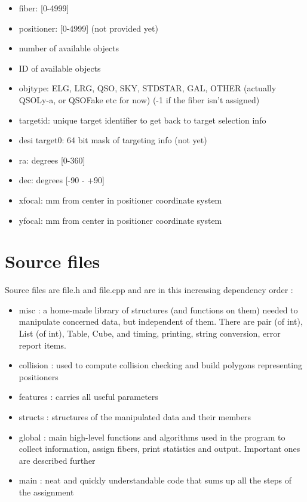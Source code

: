 \documentclass{article}
\begin{document}
\begin{itemize}
    \item fiber: [0-4999]
    \item positioner: [0-4999] (not provided yet)
    \item number of available objects
    \item ID of available objects
    \item objtype: ELG, LRG, QSO, SKY, STDSTAR, GAL, OTHER (actually QSOLy-a, or QSOFake etc for now) (-1 if the fiber isn't assigned)
    \item targetid: unique target identifier to get back to target selection info
    \item desi target0: 64 bit mask of targeting info (not yet)
    \item ra: degrees [0-360]
    \item dec: degrees [-90 - +90]
    \item xfocal: mm from center in positioner coordinate system
    \item yfocal: mm from center in positioner coordinate system 
\end{itemize}

\section{Source files}
Source files are file.h and file.cpp and are in this increasing dependency order :
\begin{itemize}
	\item misc : a home-made library of structures (and functions on them) needed to manipulate concerned data, but independent of them. There are pair (of int), List (of int), Table, Cube, and timing, printing, string conversion, error report items.
	\item collision : used to compute collision checking and build polygons representing positioners
	\item features : carries all useful parameters
	\item structs : structures of the manipulated data and their members
	\item global : main high-level functions and algorithms used in the program to collect information, assign fibers, print statistics and output. Important ones are described further
	\item main : neat and quickly understandable code that sums up all the steps of the assignment
\end{itemize}
\end{document}

